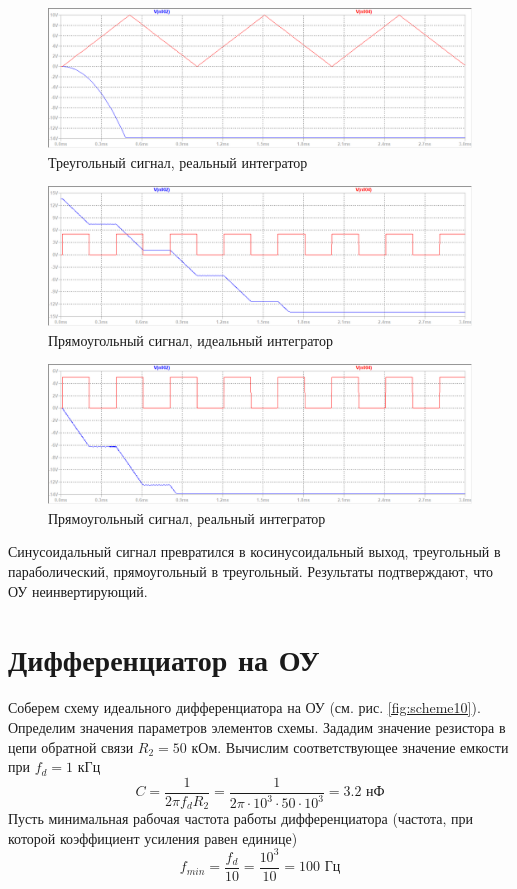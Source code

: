 \documentclass[a4paper, 12pt]{article}
\begin{document}
    \begin{figure}[H]
        \centering
        \includegraphics[scale=0.46]{3task_real_triangle.png}
        \captionsetup{skip=0pt}
        \caption{Треугольный сигнал, реальный интегратор}
        \label{fig:3task_real_triangle}
    \end{figure}
    \begin{figure}[H]
        \centering
        \includegraphics[scale=0.46]{3task_ideal_rect.png}
        \captionsetup{skip=0pt}
        \caption{Прямоугольный сигнал, идеальный интегратор}
        \label{fig:3task_ideal_rect}
    \end{figure}
    \begin{figure}[H]
        \centering
        \includegraphics[scale=0.46]{3task_real_rect.png}
        \captionsetup{skip=0pt}
        \caption{Прямоугольный сигнал, реальный интегратор}
        \label{fig:3task_real_rect}
    \end{figure}
    \noindent Синусоидальный сигнал превратился в косинусоидальный выход, треугольный в параболический,
    прямоугольный в треугольный. Результаты подтверждают, что ОУ неинвертирующий.


    \section{Дифференциатор на ОУ}
    Соберем схему идеального дифференциатора на ОУ (см. рис. \ref{fig:scheme10}). Определим значения
    параметров элементов схемы. Зададим значение резистора в цепи
    обратной связи $R_2=50$ кОм. Вычислим соответствующее значение емкости
    при $f_d=1$ кГц
    $$
    C=\dfrac{1}{2\pi f_d R_2}=\dfrac{1}{2\pi\cdot10^3\cdot50\cdot10^3}=3.2\text{ нФ}
    $$
    Пусть минимальная рабочая частота работы дифференциатора
    (частота, при которой коэффициент усиления равен единице)
    $$
    f_{min}=\dfrac{f_d}{10}=\dfrac{10^3}{10}=100\text{ Гц}
    $$
\end{document}
